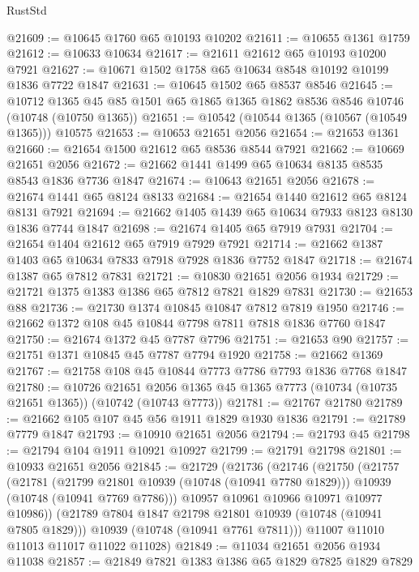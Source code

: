\begin{lexlean}{RustStd}
\begin{coremodule}
{\begin{coremodule}
{{{{{@21609 := @10645 @1760 @65 @10193 @10202
@21611 := @10655 @1361 @1759
@21612 := @10633 @10634
@21617 := @21611 @21612 @65 @10193 @10200 @7921
@21627 := @10671 @1502 @1758 @65 @10634 @8548 @10192 @10199 @1836 @7722 @1847
@21631 := @10645 @1502 @65 @8537 @8546
@21645 := @10712
    @1365
    @45
    @85
    @1501
    @65
    @1865
    @1365
    @1862
    @8536
    @8546
    @10746
    (@10748 (@10750 @1365))
@21651 := @10542 (@10544 @1365 (@10567 (@10549 @1365))) @10575
@21653 := @10653 @21651 @2056
@21654 := @21653 @1361
@21660 := @21654 @1500 @21612 @65 @8536 @8544 @7921
@21662 := @10669 @21651 @2056
@21672 := @21662 @1441 @1499 @65 @10634 @8135 @8535 @8543 @1836 @7736 @1847
@21674 := @10643 @21651 @2056
@21678 := @21674 @1441 @65 @8124 @8133
@21684 := @21654 @1440 @21612 @65 @8124 @8131 @7921
@21694 := @21662 @1405 @1439 @65 @10634 @7933 @8123 @8130 @1836 @7744 @1847
@21698 := @21674 @1405 @65 @7919 @7931
@21704 := @21654 @1404 @21612 @65 @7919 @7929 @7921
@21714 := @21662 @1387 @1403 @65 @10634 @7833 @7918 @7928 @1836 @7752 @1847
@21718 := @21674 @1387 @65 @7812 @7831
@21721 := @10830 @21651 @2056 @1934
@21729 := @21721 @1375 @1383 @1386 @65 @7812 @7821 @1829 @7831
@21730 := @21653 @88
@21736 := @21730 @1374 @10845 @10847 @7812 @7819 @1950
@21746 := @21662 @1372 @108 @45 @10844 @7798 @7811 @7818 @1836 @7760 @1847
@21750 := @21674 @1372 @45 @7787 @7796
@21751 := @21653 @90
@21757 := @21751 @1371 @10845 @45 @7787 @7794 @1920
@21758 := @21662 @1369
@21767 := @21758 @108 @45 @10844 @7773 @7786 @7793 @1836 @7768 @1847
@21780 := @10726
    @21651
    @2056
    @1365
    @45
    @1365
    @7773
    (@10734 (@10735 @21651 @1365))
    (@10742 (@10743 @7773))
@21781 := @21767 @21780
@21789 := @21662 @105 @107 @45 @56 @1911 @1829 @1930 @1836
@21791 := @21789 @7779 @1847
@21793 := @10910 @21651 @2056
@21794 := @21793 @45
@21798 := @21794 @104 @1911 @10921 @10927
@21799 := @21791 @21798
@21801 := @10933 @21651 @2056
@21845 := @21729
    (@21736
      (@21746
        (@21750
          (@21757
            (@21781
              (@21799 @21801 @10939 (@10748 (@10941 @7780 @1829)))
              @10939
              (@10748 (@10941 @7769 @7786)))
            @10957
            @10961
            @10966
            @10971
            @10977
            @10986))
        (@21789 @7804 @1847 @21798 @21801 @10939 (@10748 (@10941 @7805 @1829)))
        @10939
        (@10748 (@10941 @7761 @7811)))
      @11007
      @11010
      @11013
      @11017
      @11022
      @11028)
@21849 := @11034 @21651 @2056 @1934 @11038
@21857 := @21849 @7821 @1383 @1386 @65 @1829 @7825 @1829 @7829
}}}}}
\end{coremodule}}
\end{coremodule}
\end{lexlean}
